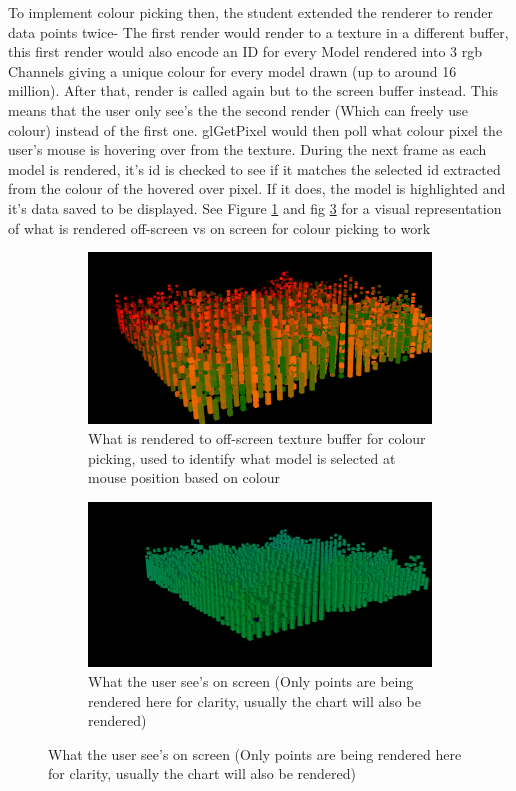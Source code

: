 To implement colour picking then, the student extended the renderer to render data points twice- The first render would render to a texture in a different buffer, this first render would also encode an ID for every Model rendered into 3 rgb Channels giving a unique colour for every model drawn (up to around 16 million). After that, render is called again but to the screen buffer instead. This means that the user only see's the the second render (Which can freely use colour) instead of the first one.
glGetPixel would then poll what colour pixel the user's mouse is hovering over from the texture. During the next frame as each model is rendered, it's id is checked to see if it matches the selected id extracted from the colour of the hovered over pixel. If it does, the model is highlighted and it's data saved to be displayed. See Figure \ref{fig:colpick} and fig \ref{fig:nocolpick} for a visual representation of what is rendered off-screen vs on screen for colour picking to work

\begin{figure}[hbt!]
    \centering
    \begin{subfigure}
        \centering
        \includegraphics[width=1\columnwidth]{author-files/figures/colourPickrender.PNG}
        \caption{What is rendered to off-screen texture buffer for colour picking, used to identify what model is selected at mouse position based on colour}
        \label{fig:colpick}
    \end{subfigure}
    \hfill
    \begin{subfigure}
        \centering
        \includegraphics[width=1\columnwidth]{author-files/figures/nopicking colourpass.PNG}
        \caption{What the user see's on screen (Only points are being rendered here for clarity, usually the chart will also be rendered)}
        \label{fig:nocolpick}
    \end{subfigure}
\end{figure}

